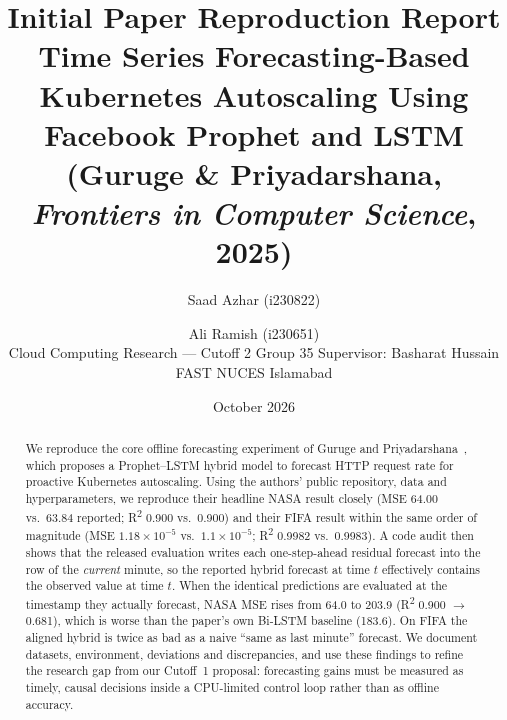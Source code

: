 \documentclass[11pt,a4paper]{article}
\title{Initial Paper Reproduction Report\\[4pt]
\large Time Series Forecasting-Based Kubernetes Autoscaling Using Facebook Prophet and LSTM\\
(Guruge \& Priyadarshana, \textit{Frontiers in Computer Science}, 2025)}
\author{Saad Azhar (i230822) \and Ali Ramish (i230651)\\[2pt]
\small Cloud Computing Research --- Cutoff 2 \quad Group 35 \quad Supervisor: Basharat Hussain\\
\small FAST NUCES Islamabad}
\date{October 2026}
\begin{document}
\maketitle

\begin{abstract}
We reproduce the core offline forecasting experiment of Guruge and Priyadarshana~\cite{guruge2025}, which proposes a Prophet--LSTM hybrid model to forecast HTTP request rate for proactive Kubernetes autoscaling. Using the authors' public repository, data and hyperparameters, we reproduce their headline NASA result closely (MSE 64.00 vs.\ 63.84 reported; R\textsuperscript{2} 0.900 vs.\ 0.900) and their FIFA result within the same order of magnitude (MSE $1.18\times10^{-5}$ vs.\ $1.1\times10^{-5}$; R\textsuperscript{2} 0.9982 vs.\ 0.9983). A code audit then shows that the released evaluation writes each one-step-ahead residual forecast into the row of the \emph{current} minute, so the reported hybrid forecast at time $t$ effectively contains the observed value at time $t$. When the identical predictions are evaluated at the timestamp they actually forecast, NASA MSE rises from 64.0 to 203.9 (R\textsuperscript{2} 0.900 $\rightarrow$ 0.681), which is worse than the paper's own Bi-LSTM baseline (183.6). On FIFA the aligned hybrid is twice as bad as a naive ``same as last minute'' forecast. We document datasets, environment, deviations and discrepancies, and use these findings to refine the research gap from our Cutoff~1 proposal: forecasting gains must be measured as timely, causal decisions inside a CPU-limited control loop rather than as offline accuracy.
\end{abstract}

\tableofcontents
\newpage

\end{document}
